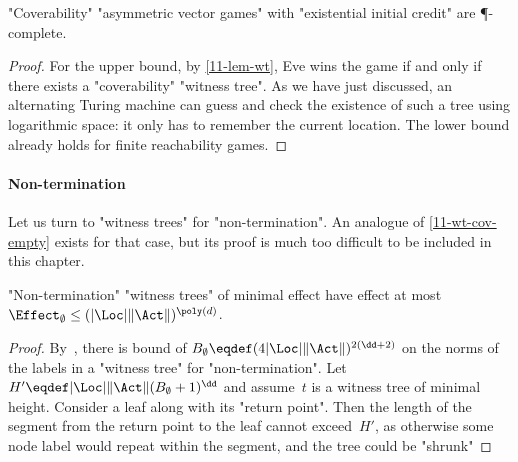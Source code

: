 \begin{theorem}\label{11-cov-exist-P}
  "Coverability" "asymmetric vector games" with "existential initial
  credit" are \P-complete.
\end{theorem}
\begin{proof}
  For the upper bound, by \cref{11-lem-wt}, Eve wins the game if and
  only if there exists a "coverability" "witness tree".  As we have
  just discussed, an alternating Turing machine can guess and check
  the existence of such a tree using logarithmic space: it only has to
  remember the current location.  The lower bound already holds for
  finite reachability games.
\end{proof}

\paragraph{Non-termination}
Let us turn to "witness trees" for "non-termination".  An analogue
of \cref{11-wt-cov-empty} exists for that case, but its proof is much
too difficult to be included in this chapter.
\begin{claim}
  "Non-termination" "witness trees" of minimal effect have effect at most
  $\Effect_\emptyset\leq(|\Loc|\|\Act\|)^{\poly(d)}$.
\end{claim}
\begin{proof}
  By~\cite{Jurdzinski&Lazic&Schmitz:2015}, there is bound of
  $B_\emptyset\eqdef(4|\Loc|\|\Act\|)^{2(\dd+2)}$ on the norms of the
  labels in a "witness tree" for "non-termination".  Let $H'\eqdef
  |\Loc|\|\Act\| (B_\emptyset+1)^{\dd}$ and assume~$t$ is a witness
  tree of minimal height.  Consider a leaf along with its "return
  point".  Then the length of the segment from the return point to the
  leaf cannot exceed~$H'$, as otherwise some node label would repeat
  within the segment, and the tree could be "shrunk"
\end{proof}
